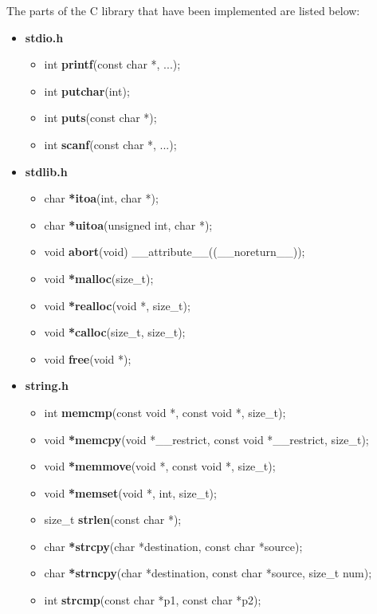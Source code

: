 The parts of the C library that have been implemented are listed below:
\begin{itemize}
    \item \textbf{stdio.h}
    \begin{itemize}
       \item int \textbf{printf}(const char *, ...);
       \item int \textbf{putchar}(int);
       \item int \textbf{puts}(const char *);
       \item int \textbf{scanf}(const char *, ...);
    \end{itemize}
\pagebreak
    \item \textbf{stdlib.h}
    \begin{itemize}
        \item char \textbf{*itoa}(int, char *);
        \item char \textbf{*uitoa}(unsigned int, char *);
        \item void \textbf{abort}(void) \_\_attribute\_\_((\_\_noreturn\_\_));
        \item void \textbf{*malloc}(size\_t);
        \item void \textbf{*realloc}(void *, size\_t);
        \item void \textbf{*calloc}(size\_t, size\_t);
        \item void \textbf{free}(void *);
    \end{itemize}
    \vspace{1cm}
    \item \textbf{string.h}
    \begin{itemize}
        \item int \textbf{memcmp}(const void *, const void *, size\_t);
        \item void \textbf{*memcpy}(void *\_\_restrict, const void *\_\_restrict, size\_t);
        \item void \textbf{*memmove}(void *, const void *, size\_t);
        \item void \textbf{*memset}(void *, int, size\_t);
        \item size\_t \textbf{strlen}(const char *);
        \item char \textbf{*strcpy}(char *destination, const char *source);
        \item char \textbf{*strncpy}(char *destination, const char *source, size\_t num);
        \item int \textbf{strcmp}(const char *p1, const char *p2);
    \end{itemize}
\end{itemize}
\pagebreak